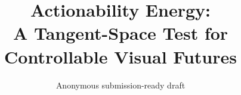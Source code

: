 \documentclass[10pt]{article}
\title{\vspace{-1em}Actionability Energy:\\A Tangent-Space Test for Controllable Visual Futures}
\author{Anonymous submission-ready draft}
\date{}
\begin{document}
\maketitle

\begin{abstract}

\end{abstract}













\appendix

\end{document}
